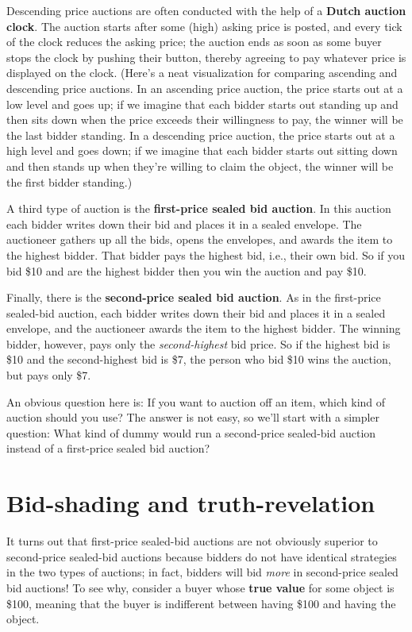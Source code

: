 Descending price auctions are often conducted with the help of a \textbf{Dutch auction clock}. The auction starts after some (high) asking price is posted, and every tick of the clock reduces the asking price; the auction ends as soon as some buyer stops the clock by pushing their button, thereby agreeing to pay whatever price is displayed on the clock. (Here's a neat visualization for comparing ascending and descending price auctions. In an ascending price auction, the price starts out at a low level and goes up; if we imagine that each bidder starts out standing up and then sits down when the price exceeds their willingness to pay, the winner will be the last bidder standing. In a descending price auction, the price starts out at a high level and goes down; if we imagine that each bidder starts out sitting down and then stands up when they're willing to claim the object, the winner will be the first bidder standing.)

A third type of auction is the \textbf{first-price sealed bid auction}. In this auction each bidder writes down their bid and places it in a sealed envelope. The auctioneer gathers up all the bids, opens the envelopes, and awards the item to the highest bidder. That bidder pays the highest bid, i.e., their own bid. So if you bid \$10 and are the highest bidder then you win the auction and pay \$10.

Finally, there is the \textbf{second-price sealed bid auction}. As in the first-price sealed-bid auction, each bidder writes down their bid and places it in a sealed envelope, and the auctioneer awards the item to the highest bidder. The winning bidder, however, pays only the \textit{second-highest} bid price. So if the highest bid is \$10 and the second-highest bid is \$7, the person who bid \$10 wins the auction, but pays only \$7.


An obvious question here is: If you want to auction off an item, which kind of auction should you use? The answer is not easy, so we'll start with a simpler question: What kind of dummy would run a second-price sealed-bid auction instead of a first-price sealed bid auction?

\section{Bid-shading and truth-revelation}

It turns out that first-price sealed-bid auctions are not obviously superior to second-price sealed-bid auctions because bidders do not have identical strategies in the two types of auctions; in fact, bidders will bid \emph{more} in second-price sealed bid auctions! To see why, consider a buyer whose \textbf{true value} for some object is \$100, meaning that the buyer is indifferent between having \$100 and having the object.


